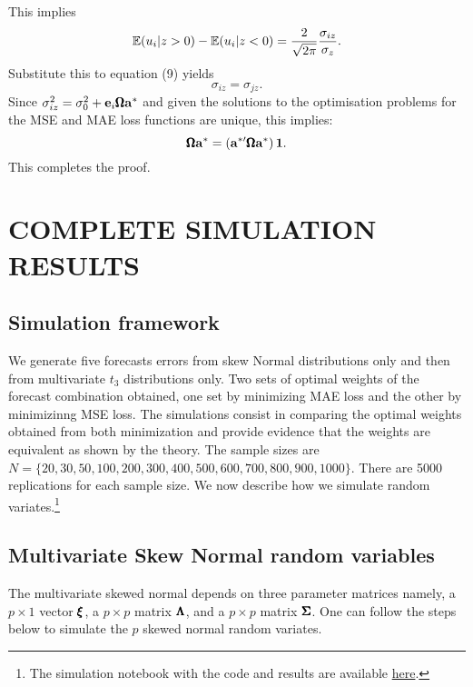 \documentclass[a4paper, 11pt]{article}
\begin{document}
\begin{proving}
\noindent This implies 
\begin{equation*} 
   \mathbb{E} (u_i | z>0) - \mathbb{E} (u_i | z<0) = \frac{2}{\sqrt{2\pi}} \frac{\sigma_{iz}}{\sigma_z}.
\end{equation*}
\noindent Substitute this to equation (9) yields
\begin{equation*} 
   \sigma_{iz} = \sigma_{jz}.
\end{equation*}
\noindent Since $\sigma^2_{iz} = \sigma^2_0 + \mathbf{e}_i \pmb{\Omega} \mathbf{a}^*$ and given the solutions to the optimisation problems for the MSE and MAE loss functions are unique, this implies:
\begin{equation}
   \pmb{\Omega} \mathbf{a}^* = \left ( \mathbf{a}^{*\prime} \pmb{\Omega} \mathbf{a}^* \right ) \mathbf{1}. 
\end{equation} 
\noindent This completes the proof. 
   \end{proving}
  

\section{COMPLETE SIMULATION RESULTS}

\subsection{Simulation framework}
We generate five forecasts errors from skew Normal distributions only and then from multivariate $t_3$ distributions only. Two sets of optimal weights of the forecast combination obtained, one set by minimizing MAE loss and the other by minimizinng MSE loss. The simulations consist in comparing the optimal weights obtained from both minimization and provide evidence that the weights are equivalent as shown by the theory. 
The sample sizes are $N = \{20,30,50,100,200,300,400,500,600,700,800,900,1000 \}$. There are 5000 replications for each sample size. We now describe how we simulate random variates.\footnote{The simulation notebook with the code and results are available \href{https://gitlab.com/laurent_pauwels/forecast-combination-mae/-/blob/master/Section\%204\%20Simulations/SimulationsJulia.ipynb}{here}.} 


\subsection{Multivariate Skew Normal random variables}
The multivariate skewed normal depends on three parameter matrices namely, a $p\times 1$ vector $\pmb{\xi}$, a $p\times p$ matrix $\pmb{\Lambda}$, and a $p\times p$ matrix $\pmb{\Sigma}$. One can follow the steps below to simulate the $p$ skewed normal random variates. 
\end{document}
